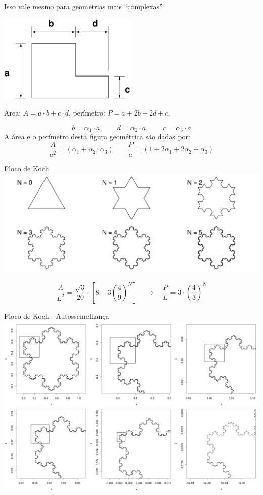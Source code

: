 \documentclass{beamer}
\newcommand{\lra}{\ensuremath{\longrightarrow}}
\newcommand{\qrq}{\ensuremath{\quad\lra\quad}}
\begin{document}
\begin{frame}{Isso vale mesmo para geometrias mais ``complexas''}
  \begin{center}
    \includegraphics[width=0.5\textwidth]{./figuras/L2d.pdf}
  \end{center}
  Area: $A = a\cdot b + c\cdot d$, perímetro: $P = a + 2b + 2d + c$.

  \[
b = \alpha_1\cdot a, \qquad d = \alpha_2\cdot a, \qquad c = \alpha_3\cdot a
\]
A área e o perímetro desta figura geométrica são dadas por:
\[
\frac{A}{a^2} = (\alpha_1 + \alpha_2\cdot\alpha_3) \qquad \frac{P}{a} = (1 + 2\alpha_1+2\alpha_2+\alpha_3)
\]
\end{frame}

\begin{frame}{Floco de Koch}
\centering
\includegraphics[width=\textwidth]{./figuras/koch.pdf}

\[
\frac{A}{L^2} = \frac{\sqrt{3}}{20} \cdot \left[8 - 3\left(\frac{4}{9}\right)^N\right] \qrq \frac{P}{L} = 3\cdot\left(\frac{4}{3}\right)^N
\]
\end{frame}


\begin{frame}{Floco de Koch - Autossemelhança}
  \centering
\includegraphics[width=1\textwidth]{./figuras/koch-self.png}
\end{frame}
\end{document}
